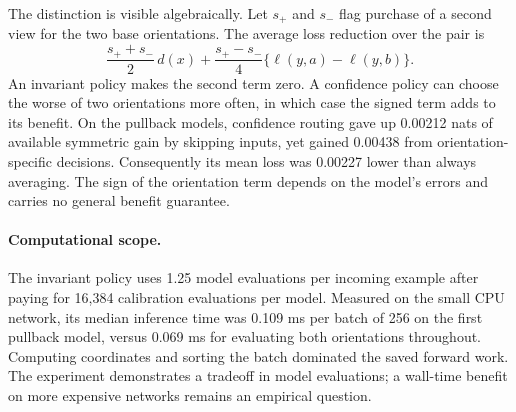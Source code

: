 The distinction is visible algebraically. Let $s_+$ and $s_-$ flag purchase of a second view for the two base orientations. The average loss reduction over the pair is
\[
 \frac{s_++s_-}{2}\,d(x)
 +\frac{s_+-s_-}{4}\{\ell(y,a)-\ell(y,b)\}.
\]
An invariant policy makes the second term zero. A confidence policy can choose the worse of two orientations more often, in which case the signed term adds to its benefit. On the pullback models, confidence routing gave up 0.00212 nats of available symmetric gain by skipping inputs, yet gained 0.00438 from orientation-specific decisions. Consequently its mean loss was 0.00227 lower than always averaging. The sign of the orientation term depends on the model's errors and carries no general benefit guarantee.

\paragraph{Computational scope.}
The invariant policy uses 1.25 model evaluations per incoming example after paying for 16,384 calibration evaluations per model. Measured on the small CPU network, its median inference time was 0.109 ms per batch of 256 on the first pullback model, versus 0.069 ms for evaluating both orientations throughout. Computing coordinates and sorting the batch dominated the saved forward work. The experiment demonstrates a tradeoff in model evaluations; a wall-time benefit on more expensive networks remains an empirical question.
